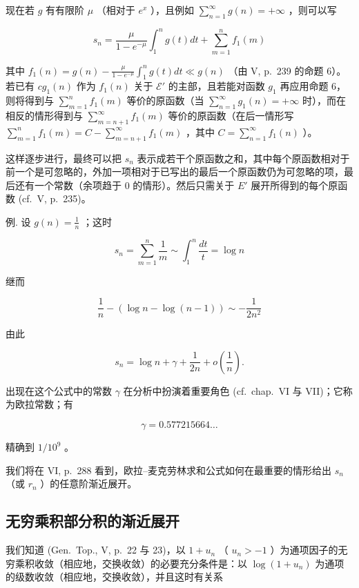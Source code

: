 现在若 \(g\) 有有限阶 \(\mu\) （相对于 \(e^x\) ），且例如 \(\sum_{n=1}^{\infty} g(n) = +\infty\) ，则可以写

\[
s _ {n} = \frac {\mu}{1 - e ^ {- \mu}} \int_ {1} ^ {n} g (t) d t + \sum_ {m = 1} ^ {n} f _ {1} (m)
\]

其中 \(f_{1}(n) = g(n) - \frac{\mu}{1 - e^{-\mu}}\int_{1}^{n}g(t)dt \ll g(n)\) （由 V, p.~239 的命题 6）。若已有 \(cg_{1}(n)\) 作为 \(f_{1}(n)\) 关于 \(\mathcal{E}'\) 的主部，且若能对函数 \(g_{1}\) 再应用命题 6，则将得到与 \(\sum_{m=1}^{n}f_{1}(m)\) 等价的原函数（当 \(\sum_{n=1}^{\infty}g_{1}(n) = +\infty\) 时），而在相反的情形得到与 \(\sum_{m=n+1}^{\infty}f_{1}(m)\) 等价的原函数（在后一情形写 \(\sum_{m=1}^{n}f_{1}(m) = C - \sum_{m=n+1}^{\infty}f_{1}(m)\) ，其中 \(C = \sum_{n=1}^{\infty}f_{1}(n)\) ）。

这样逐步进行，最终可以把 \(s_{n}\) 表示成若干个原函数之和，其中每个原函数相对于前一个是可忽略的，外加一项相对于已写出的最后一个原函数仍为可忽略的项，最后还有一个常数（余项趋于 0 的情形）。然后只需关于 \(E'\) 展开所得到的每个原函数 (cf.~V, p.~235)。

例. 设 \(g(n) = \frac{1}{n}\) ；这时

\[
s _ {n} = \sum_ {m = 1} ^ {n} \frac {1}{m} \sim \int_ {1} ^ {n} \frac {d t}{t} = \log n
\]

继而

\[
\frac {1}{n} - (\log n - \log (n - 1)) \sim - \frac {1}{2 n ^ {2}}
\]

由此

\[
s _ {n} = \log n + \gamma + \frac {1}{2 n} + o \left(\frac {1}{n}\right).
\]

出现在这个公式中的常数 \(\gamma\) 在分析中扮演着重要角色 (cf.~chap.~VI 与 VII)；它称为欧拉常数；有

\[
\gamma = 0. 5 7 7   2 1 5   6 6 4 \dots
\]

精确到 \(1/10^{9}\) 。

我们将在 VI, p.~288 看到，欧拉–麦克劳林求和公式如何在最重要的情形给出 \(s_n\) （或 \(r_n\) ）的任意阶渐近展开。

\subsection{无穷乘积部分积的渐近展开}

我们知道 (Gen.~Top., V, p.~22 与 23)，以 \(1 + u_{n}\) （ \(u_{n} > -1\) ）为通项因子的无穷乘积收敛（相应地，交换收敛）的必要充分条件是：以 \(\log(1 + u_{n})\) 为通项的级数收敛（相应地，交换收敛），并且这时有关系

